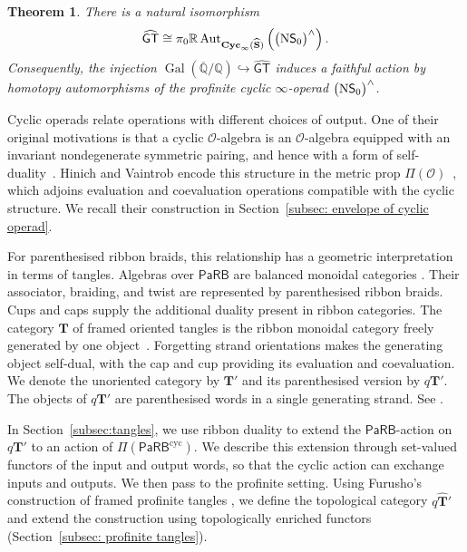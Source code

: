 \documentclass{amsart}
\newcommand{\bT}{\mathbf{T}}
\newcommand{\calO}{\mathcal{O}}
\newcommand{\sSet}{\mathbf{S}}
\newcommand{\PaRB}{\mathsf{PaRB}}
\newcommand{\Cyc}{\mathbf{Cyc}}
\newcommand{\Aut}{\operatorname{Aut}}
\newcommand{\nerve}{\textnormal{N}}
\newcommand{\GT}{\widehat{\mathsf{GT}}}
\newtheorem*{thm*}{Theorem}
\theoremstyle{definition}
\numberwithin{equation}{section}
\begin{document}
\begin{thm*}
There is a natural isomorphism
\[
\GT
\cong
\pi_0\mathbb R\Aut_{\Cyc_\infty(\widehat{\sSet})}
\left(
\bigl(\nerve\mathsf S_0\bigr)^{\wedge}
\right).
\]
Consequently, the injection
$\operatorname{Gal}(\overline{\mathbb Q}/\mathbb Q)\hookrightarrow
\GT$ induces a faithful action by homotopy automorphisms of the
profinite cyclic $\infty$-operad
$\bigl(\nerve\mathsf S_0\bigr)^{\wedge}$.
\end{thm*}

Cyclic operads relate operations with different choices of
output. One of their original motivations is that a cyclic
$\calO$-algebra is an $\calO$-algebra equipped with an invariant
nondegenerate symmetric pairing, and hence with a form of
self-duality~\cite{gk_cyc}. Hinich and Vaintrob encode this
structure in the metric prop $\Pi(\calO)$~\cite{hv_cyclic},
which adjoins evaluation and coevaluation operations compatible
with the cyclic structure. We recall their construction in
Section~\ref{subsec: envelope of cyclic operad}.

For parenthesised ribbon braids, this relationship has a
geometric interpretation in terms of tangles. Algebras over
$\PaRB$ are balanced monoidal categories
\cite[Theorem~1.4.7]{Wahl_Thesis}. Their associator, braiding,
and twist are represented by parenthesised ribbon braids.
Cups and caps supply the additional duality present in ribbon
categories. The category $\bT$ of framed oriented tangles
is the ribbon monoidal category freely generated by one
object~\cite{shum_tortile_1994}. Forgetting strand orientations
makes the generating object self-dual, with the cap and cup
providing its evaluation and coevaluation. We denote the
unoriented category by $\bT'$ and its parenthesised version
by $q\bT'$. The objects of $q\bT'$ are parenthesised words
in a single generating strand. See
\cite[Remark~4.1 and Section~8.2]{mousaaid2021affinization}.

In Section~\ref{subsec:tangles}, we use ribbon duality to
extend the $\PaRB$-action on $q\bT'$ to an action of
$\Pi(\PaRB^{\mathrm{cyc}})$. We describe this extension
through set-valued functors of the input and output words,
so that the cyclic action can exchange inputs and outputs.
We then pass to the profinite setting. Using Furusho's
construction of framed profinite tangles
\cite[Appendix~B]{furusho_galois_2017}, we define the
topological category $q\widehat{\bT}'$ and extend the
construction using topologically enriched functors
(Section~\ref{subsec: profinite tangles}).
\end{document}
